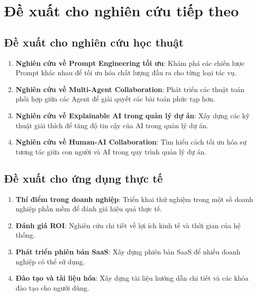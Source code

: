 \documentclass[12pt,a4paper]{report}
\begin{document}
\section{Đề xuất cho nghiên cứu tiếp theo}

\subsection{Đề xuất cho nghiên cứu học thuật}

\begin{enumerate}
\item \textbf{Nghiên cứu về Prompt Engineering tối ưu}:
Khám phá các chiến lược Prompt khác nhau để tối ưu hóa chất lượng đầu ra cho từng loại tác vụ.

\item \textbf{Nghiên cứu về Multi-Agent Collaboration}:
Phát triển các thuật toán phối hợp giữa các Agent để giải quyết các bài toán phức tạp hơn.

\item \textbf{Nghiên cứu về Explainable AI trong quản lý dự án}:
Xây dựng các kỹ thuật giải thích để tăng độ tin cậy của AI trong quản lý dự án.

\item \textbf{Nghiên cứu về Human-AI Collaboration}:
Tìm hiểu cách tối ưu hóa sự tương tác giữa con người và AI trong quy trình quản lý dự án.
\end{enumerate}

\subsection{Đề xuất cho ứng dụng thực tế}

\begin{enumerate}
\item \textbf{Thí điểm trong doanh nghiệp}:
Triển khai thử nghiệm trong một số doanh nghiệp phần mềm để đánh giá hiệu quả thực tế.

\item \textbf{Đánh giá ROI}:
Nghiên cứu chi tiết về lợi ích kinh tế và thời gian của hệ thống.

\item \textbf{Phát triển phiên bản SaaS}:
Xây dựng phiên bản SaaS để nhiều doanh nghiệp có thể sử dụng.

\item \textbf{Đào tạo và tài liệu hóa}:
Xây dựng tài liệu hướng dẫn chi tiết và các khóa đào tạo cho người dùng.
\end{enumerate}
\end{document}
